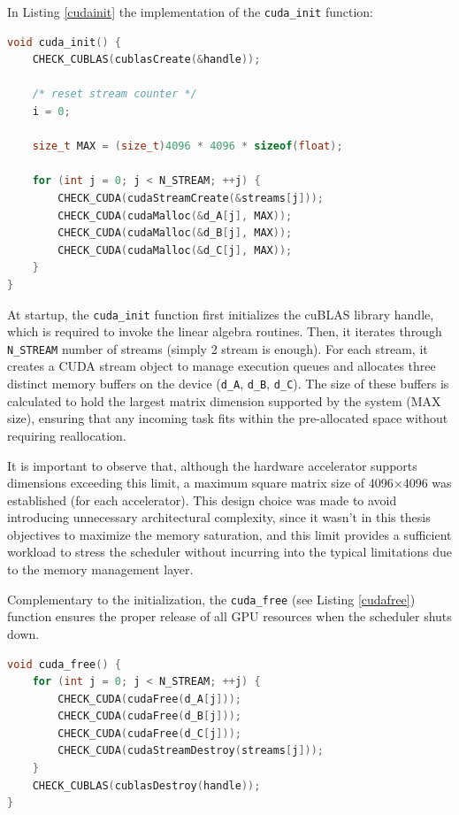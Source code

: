 \clearpage

In Listing \ref{cudainit} the implementation of the \texttt{cuda\_init} function:

\begin{lstlisting}[caption={cuda\_runner.cu init}, language=C++, label={cudainit}] 
void cuda_init() {
    CHECK_CUBLAS(cublasCreate(&handle));

    /* reset stream counter */
    i = 0;

    size_t MAX = (size_t)4096 * 4096 * sizeof(float);

    for (int j = 0; j < N_STREAM; ++j) {
        CHECK_CUDA(cudaStreamCreate(&streams[j]));
        CHECK_CUDA(cudaMalloc(&d_A[j], MAX));
        CHECK_CUDA(cudaMalloc(&d_B[j], MAX));
        CHECK_CUDA(cudaMalloc(&d_C[j], MAX));
    }
}
\end{lstlisting}

At startup, the \texttt{cuda\_init} function first initializes the cuBLAS library handle, which is required to invoke the linear algebra routines.
Then, it iterates through \texttt{N\_STREAM} number of streams (simply 2 stream is enough). For each stream, it creates a CUDA stream object to manage execution queues and allocates three distinct memory buffers on the device (\texttt{d\_A}, \texttt{d\_B}, \texttt{d\_C}). The size of these buffers is calculated to hold the largest matrix dimension supported by the system (MAX size), ensuring that any incoming task fits within the pre-allocated space without requiring reallocation.

It is important to observe that, although the hardware accelerator supports dimensions exceeding this limit, a maximum square matrix size of 4096×4096 was established (for each accelerator). This design choice was made to avoid introducing unnecessary architectural complexity, since it wasn't in this thesis objectives to maximize the memory saturation, and this limit provides a sufficient workload to stress the scheduler without incurring into the typical limitations due to the memory management layer.

Complementary to the initialization, the \texttt{cuda\_free} (see Listing \ref{cudafree}) function ensures the proper release of all GPU resources when the scheduler shuts down.

\begin{lstlisting}[caption={cuda\_runner.cu free}, language=C++, label={cudafree}] 
void cuda_free() {
    for (int j = 0; j < N_STREAM; ++j) {
        CHECK_CUDA(cudaFree(d_A[j]));
        CHECK_CUDA(cudaFree(d_B[j]));
        CHECK_CUDA(cudaFree(d_C[j]));
        CHECK_CUDA(cudaStreamDestroy(streams[j]));
    }
    CHECK_CUBLAS(cublasDestroy(handle));
}
\end{lstlisting}

